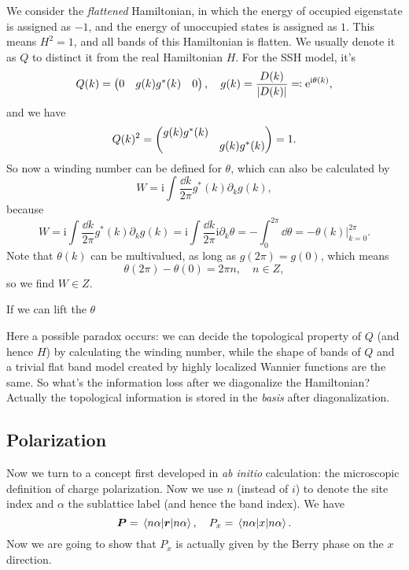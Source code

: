 \documentclass[hyperref, a4paper]{article}
\newcommand*{\ii}{\mathrm{i}}
\newcommand*{\ee}{\mathrm{e}}
\def\\{}%
\def\mathbb#1{#1}%
\begin{document}
We consider the \emph{flattened} Hamiltonian, in which the energy of occupied eigenstate is assigned as $-1$,
and the energy of unoccupied states is assigned as $1$. This means $H^2 = 1$, and all bands of this Hamiltonian
is flatten. We usually denote it as $Q$ to distinct it from the real Hamiltonian $H$. 
For the SSH model, it's 
\begin{equation}
    Q(k) = \pmqty{0 & g(k) \\ g^*(k) & 0}, \quad g(k) = \frac{D(k)}{\abs{D(k)}} \eqqcolon \ee^{\ii \theta(k)},
\end{equation}
and we have 
\begin{equation}
    Q(k)^2 = \pmqty{\dmat{g(k) g^*(k), g(k) g^*(k)}} = 1.
\end{equation}
So now a winding number can be defined for $\theta$, which can also be calculated by 
\begin{equation}
    W = \ii \int \frac{\dd{k}}{2\pi} g^*(k) \partial_k g(k) ,
\end{equation}
because 
\begin{equation}
    W= \ii \int \frac{\dd{k}}{2\pi} g^*(k) \partial_k g(k)  = \ii \int \frac{\dd{k}}{2\pi} \ii \partial_k \theta = - \int_0^{2\pi} \dd{\theta} = - \theta(k)|^{2\pi}_{k=0}.
\end{equation}
Note that $\theta(k)$ can be multivalued, as long as $g(2\pi) = g(0)$, which means
\[
    \theta(2\pi) - \theta(0) = 2\pi n , \quad n \in \mathbb{Z},
\]
so we find $W \in \mathbb{Z}$.

If we can lift the $\theta$

Here a possible paradox occurs: we can decide the topological property of $Q$ (and hence $H$) by calculating 
the winding number, while the shape of bands of $Q$ and a trivial flat band model created by highly localized 
Wannier functions are the same. So what's the information loss after we diagonalize the Hamiltonian?
Actually the topological information is stored in the \emph{basis} after diagonalization. 

\subsection{Polarization}

Now we turn to a concept first developed in \emph{ab initio} calculation: the microscopic definition of 
charge polarization. Now we use $n$ (instead of $i$) to denote the site index and $\alpha$ the sublattice label
(and hence the band index). We have 
\begin{equation}
    \vb*{P} = \expval{\vb*{r}}{n \alpha}, \quad P_x = \expval{x}{n \alpha}.
\end{equation}
Now we are going to show that $P_x$ is actually given by the Berry phase on the $x$ direction.
\end{document}

